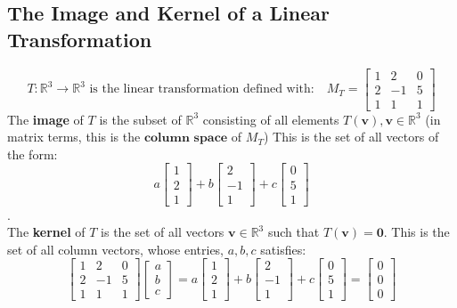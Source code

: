 \documentclass[a4paper, 9pt]{extarticle}
\begin{document}
\subsection{The Image and Kernel of a Linear Transformation}
$$
  \text{$T:\mathbb{R}^3 \to \mathbb{R}^3$ is the linear transformation defined with:} \quad
  M_T = \begin{bmatrix}
    1 & 2  & 0 \\
    2 & -1 & 5 \\
    1 & 1  & 1
  \end{bmatrix}
$$
The \textbf{image} of $T$ is the subset of $\mathbb{R}^3$ consisting of all elements $T(\mathbf{v}), \mathbf{v} \in \mathbb{R}^3$ (in matrix terms, this is the $\textbf{column space}$ of $M_T$) This is the set of all vectors of the form:
$$
  a \begin{bmatrix}
    1 \\
    2 \\
    1
  \end{bmatrix}
  +
  b \begin{bmatrix}
    2  \\
    -1 \\
    1
  \end{bmatrix}
  +
  c \begin{bmatrix}
    0 \\
    5 \\
    1
  \end{bmatrix}
$$
. \\
The \textbf{kernel} of $T$ is the set of all vectors $\mathbf{v} \in \mathbb{R}^3$ such that $T(\mathbf{v}) = \mathbf{0}$. This is the set of all column vectors, whose entries, $a,b,c$ satisfies:
$$
  \begin{bmatrix}
    1 & 2  & 0 \\
    2 & -1 & 5 \\
    1 & 1  & 1
  \end{bmatrix}
  \begin{bmatrix}
    a \\
    b \\
    c
  \end{bmatrix}
  =
  a \begin{bmatrix}
    1 \\
    2 \\
    1
  \end{bmatrix}
  +
  b \begin{bmatrix}
    2  \\
    -1 \\
    1
  \end{bmatrix}
  +
  c \begin{bmatrix}
    0 \\
    5 \\
    1
  \end{bmatrix}
  =
  \begin{bmatrix}
    0 \\
    0 \\
    0
  \end{bmatrix}
$$
\end{document}
